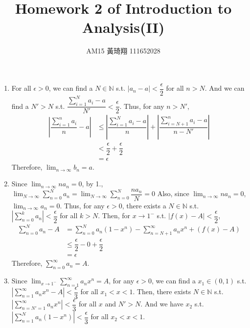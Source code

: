 \documentclass[12pt]{article}
\title{Homework 2 of Introduction to Analysis(II)}
\author{AM15 黃琦翔 111652028}
\begin{document}
\maketitle
\begin{enumerate}
    \item For all $\epsilon > 0$, we can find a $N \in \mathbb{N}$ s.t. $|a_n - a| < \dfrac{\epsilon}{2}$ for all $n > N$.
    And we can find a $N' > N$ s.t. $\dfrac{\displaystyle\sum_{i=1}^{N} a_i - a}{N'} < \dfrac{\epsilon}{2}$.
    Thus, for any $n > N'$, \begin{align*}
        |\dfrac{\sum_{i=1}^{n} a_i }{n} - a| &\leq |\dfrac{\sum_{i=1}^{N} a_i - a}{n}| + |\dfrac{\sum_{i=N+1}^{n} a_i - a}{n - N'}|\\
        &< \dfrac{\epsilon}{2} + \dfrac{\epsilon}{2}\\
        &= \epsilon
    \end{align*}
    Therefore, $\displaystyle\lim_{n\to\infty} b_n = a$.

    \item Since $\displaystyle\lim_{n\to\infty} na_n = 0$, by 1., $\displaystyle\lim_{N\to\infty} \displaystyle\sum_{n=0}^{N} a_n = \displaystyle\lim_{N\to\infty} \displaystyle\sum_{n=0}^{N} \dfrac{na_n}{N} = 0$
    Also, since $\displaystyle\lim_{n\to\infty} na_n = 0$, $\displaystyle\lim_{n\to\infty} a_n = 0$.
    Thus, for any $\epsilon > 0$,  there exists a $N \in \mathbb{N}$ s.t. $|\displaystyle\sum_{n=0}^{k} a_n| < \dfrac{\epsilon}{2}$ for all $k > N$.
    Then, for $x \to 1^{-}$ s.t. $|f(x) - A| < \dfrac{\epsilon}{2}$, \begin{align*}
        \sum_{n=0}^{N} a_n - A &= \sum_{n=0}^{N} a_n(1-x^n) - \sum_{n=N+1}^{\infty} a_n x^n + (f(x) - A)\\
        &\leq \dfrac{\epsilon}{2} - 0 + \dfrac{\epsilon}{2}\\
        &= \epsilon
    \end{align*}
    Therefore, $\displaystyle\sum_{n=0}^{\infty} a_n = A$.

    \newpage
    \item Since $\displaystyle\lim_{x\to 1^-} \displaystyle\sum_{n=1}^{\infty} a_nx^n = A$,
    for any $\epsilon > 0$, we can find a $x_1 \in (0, 1)$ s.t. $|\displaystyle\sum_{n=1}^{\infty} a_nx^n - A| < \dfrac{\epsilon}{3}$ for all $x_1 < x < 1$.
    Then, there exists $N\in\mathbb{N}$ s.t. $|\sum_{n=N'=1}^{\infty} a_n x^n| < \dfrac{\epsilon}{3}$ for all $x$ and $N' > N$.
    And we have $x_2$ s.t. $|\displaystyle\sum_{n=1}^{N} a_n(1-x^n)| < \dfrac{\epsilon}{3}$ for all $x_2 < x < 1$.


\end{enumerate}
\end{document}
